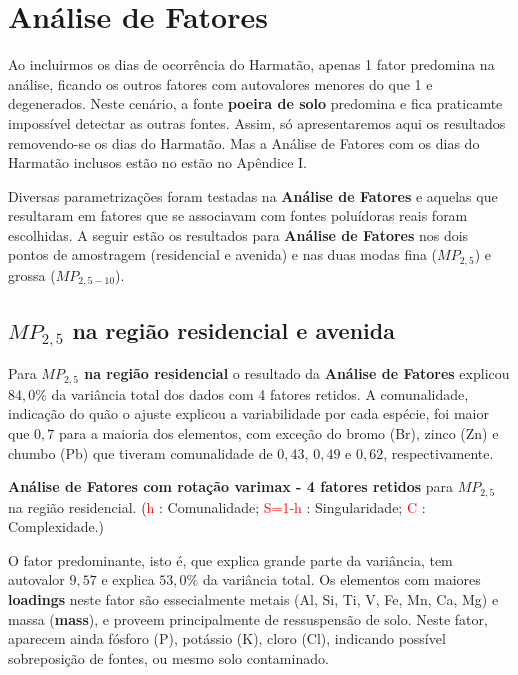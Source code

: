 \section{Análise de Fatores}

Ao incluirmos os dias de ocorrência do Harmatão, apenas 1 fator
predomina na análise, ficando os outros fatores com autovalores
menores do que 1 e degenerados. Neste cenário, a fonte 
\textbf{poeira de solo} predomina e fica praticamte impossível
detectar as outras fontes. Assim, só apresentaremos aqui os resultados 
removendo-se os dias do Harmatão. Mas a Análise de Fatores com os
dias do Harmatão inclusos estão no estão no Apêndice I.

Diversas parametrizações foram testadas na \textbf{Análise de Fatores}
e aquelas que resultaram em fatores que se associavam com fontes poluídoras
reais foram escolhidas. A seguir estão os resultados para 
\textbf{Análise de Fatores} nos dois pontos de amostragem 
(residencial e avenida) e nas duas modas
fina ($MP_{2,5}$) e grossa ($MP_{2,5-10}$).



\subsection{$MP_{2,5}$ na região residencial e avenida}

Para \textbf{$MP_{2,5}$ na região residencial} o resultado da 
\textbf{Análise de Fatores}  explicou $84,0\%$ da variância total 
dos dados com 4 fatores retidos.
A comunalidade, indicação do quão o ajuste explicou a variabilidade por 
cada espécie, foi maior que $0,7$ para a maioria dos elementos,
com exceção do bromo (Br), zinco (Zn) e chumbo (Pb) que tiveram comunalidade 
de $0,43$, $0,49$ e $0,62$, respectivamente.

\begin{table}[H]
  \caption{\textbf{Análise de Fatores com rotação varimax - 4 fatores retidos} 
             para $MP_{2,5}$ na região residencial.
           (\textcolor{red}{h} : Comunalidade; 
           \textcolor{red}{S=1-h} : Singularidade; 
           \textcolor{red}{C} : Complexidade.)}
  
\end{table}

O fator predominante, isto é, que explica grande parte da variância, 
tem autovalor $9,57$ e explica $53,0\%$ da variância total.
Os elementos com maiores \textbf{loadings} neste fator são essecialmente 
metais (Al, Si, Ti, V, Fe, Mn, Ca, Mg) e massa (\textbf{mass}), e proveem 
principalmente de ressuspensão de solo.
Neste fator, aparecem ainda fósforo (P), potássio (K), cloro (Cl), indicando 
possível sobreposição de fontes, ou mesmo solo contaminado.

